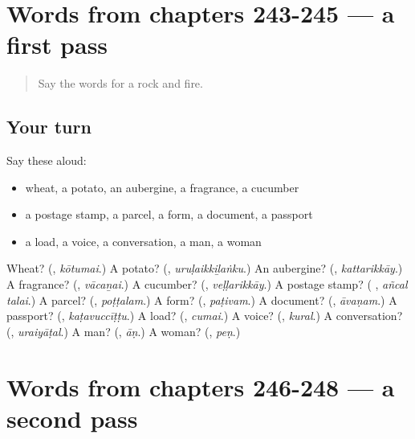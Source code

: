 \section[(dialogue)]{Words from chapters 243-245 — a first pass}

\label{lesson:TA-R248-first-pass-words-from-chapters-243-245}



\begin{quote}
Say the words for a rock and fire.
\end{quote}

\subsection*{Your turn}
Say these aloud:

\begin{itemize}
\raggedright
  \item wheat, a potato, an aubergine, a fragrance, a cucumber
  \item a postage stamp, a parcel, a form, a document, a passport
  \item a load, a voice, a conversation, a man, a woman
\end{itemize}

\begin{tcolorbox}[breakable,colback=teal!4,colframe=teal!35!black,title={Before you move on}]
Wheat? (\textbf{}, \emph{kōtumai}.) A potato? (\textbf{}, \emph{uruḷaikkiḻaṅku}.) An aubergine? (\textbf{}, \emph{kattarikkāy}.) A fragrance? (\textbf{}, \emph{vācaṉai}.) A cucumber? (\textbf{}, \emph{veḷḷarikkāy}.) A postage stamp? (\textbf{ }, \emph{añcal talai}.) A parcel? (\textbf{}, \emph{poṭṭalam}.) A form? (\textbf{}, \emph{paṭivam}.) A document? (\textbf{}, \emph{āvaṇam}.) A passport? (\textbf{}, \emph{kaṭavuccīṭṭu}.) A load? (\textbf{}, \emph{cumai}.) A voice? (\textbf{}, \emph{kural}.) A conversation? (\textbf{}, \emph{uraiyāṭal}.) A man? (\textbf{}, \emph{āṇ}.) A woman? (\textbf{}, \emph{peṇ}.)
\end{tcolorbox}
\section[(dialogue)]{Words from chapters 246-248 — a second pass}

\label{lesson:TA-R248-second-pass-words-from-chapters-246-248}



